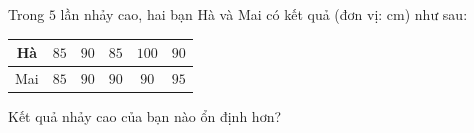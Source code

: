 \begin{ex}
Trong $5$ lần nhảy cao, hai bạn Hà và Mai có kết quả (đơn vị: cm) như sau:
\begin{center}
\begin{tabular}{|c|c|c|c|c|c|}\hline
Hà & $85$ & $90$ & $85$ & $100$ & $90$\\\hline
Mai & $85$ & $90$ & $90$ & $90$ & $95$\\\hline
\end{tabular}
\end{center}
Kết quả nhảy cao của bạn nào ổn định hơn?
\end{ex}
